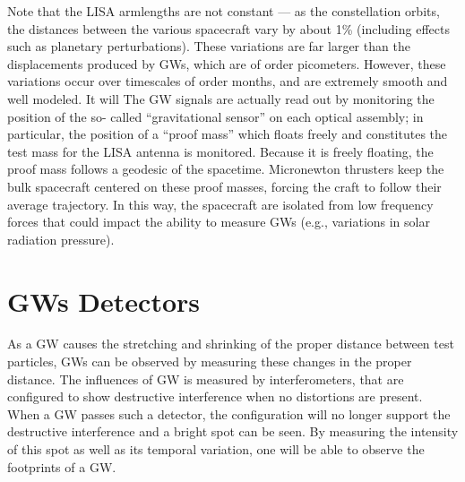 \documentclass[binding=0.6cm, LaM]{sapthesis}
\begin{document}
Note that the LISA armlengths are not constant — as the constellation orbits, the distances between the various spacecraft vary by about 1\% (including effects such as planetary perturbations).
These variations are far larger than the displacements produced by GWs, which are of order picometers.
However, these variations occur over timescales of order months, and are extremely smooth and well modeled. It will
 The GW signals are actually read out by monitoring the position of the so- called “gravitational sensor” on each optical assembly; in particular, the position of a “proof mass” which floats freely
 and constitutes the test mass for the LISA antenna is monitored. Because it is freely floating, the proof mass follows a geodesic of the spacetime.
Micronewton thrusters keep the bulk spacecraft centered on these proof masses, forcing the craft to follow their average trajectory.
In this way, the spacecraft are isolated from low frequency forces that could impact the ability to measure GWs (e.g., variations in solar radiation pressure).


\section{GWs Detectors}
As a GW causes the stretching and shrinking of the proper distance between test particles, GWs can be observed by measuring these changes in the proper distance.
The influences of GW is measured by interferometers, that are configured to show destructive interference when no distortions are present.
When a GW passes such a detector, the configuration will no longer support the destructive interference and a bright spot can be seen.
By measuring the intensity of this spot as well as its temporal variation, one will be able to observe the footprints of a GW.
\end{document}
